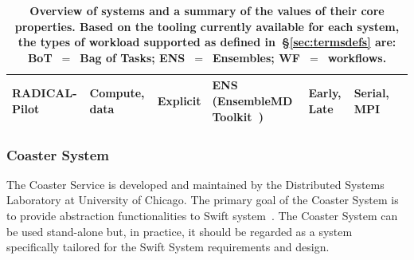\documentclass{sig-alternate}
\begin{document}
\begin{table}
\begin{tabular}{p{2.5cm}p{2.25cm}p{2cm}p{5cm}p{1.75cm}p{1.75cm}p{1.75cm}|}
    RADICAL-Pilot &
    Compute, data &
    Explicit &
    ENS (EnsembleMD Toolkit~\cite{emdtoolkit_url}) &
    Early, Late &
    Serial, MPI \\

 \bottomrule

 \end{tabular}
 \caption{\textbf{Overview of \pilot systems and a summary of the values of
 their core properties. Based on the tooling currently available for each \pilot system, the types of workload supported as defined in~\S\ref{sec:termsdefs} are: BoT~$=$~Bag of Tasks; ENS~$=$~Ensembles; WF~$=$~workflows.} }
 \label{table:implementations-properties}
\end{table}




%
\subsubsection{Coaster System}\label{sec:coaster}

The Coaster Service is developed and maintained by the Distributed Systems
Laboratory at University of Chicago. The primary goal of the Coaster System is
to provide \pilot abstraction functionalities to Swift
system~\cite{wilde2011swift,zhao2007swift}. The Coaster System can be used
stand-alone but, in practice, it should be regarded as a system specifically
tailored for the Swift System requirements and design.
\end{document}
